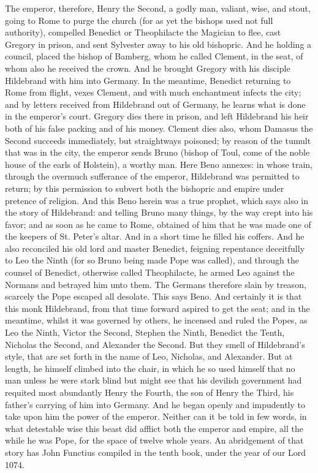 The emperor, therefore, Henry the Second, a godly man, valiant, wise, and stout, going to Rome to purge the church (for as yet the bishops used not full authority), compelled Benedict or Theophilacte the Magician to flee, cast Gregory in prison, and sent Sylvester away to his old bishopric. And he holding a council, placed the bishop of Bamberg, whom he called Clement, in the seat, of whom also he received the crown. And he brought Gregory with his disciple Hildebrand with him into Germany. In the meantime, Benedict returning to Rome from flight, vexes Clement, and with much enchantment infects the city; and by letters received from Hildebrand out of Germany, he learns what is done in the emperor’s court. Gregory dies there in prison, and left Hildebrand his heir both of his false packing and of his money. Clement dies also, whom Damasus the Second succeeds immediately, but straightways poisoned; by reason of the tumult that was in the city, the emperor sends Bruno (bishop of Toul, come of the noble house of the earls of Holstein), a worthy man. Here Beno annexes: in whose train, through the overmuch sufferance of the emperor, Hildebrand was permitted to return; by this permission to subvert both the bishopric and empire under pretence of religion. And this Beno herein was a true prophet, which says also in the story of Hildebrand: and telling Bruno many things, by the way crept into his favor; and as soon as he came to Rome, obtained of him that he was made one of the keepers of St. Peter’s altar. And in a short time he filled his coffers. And he also reconciled his old lord and master Benedict, feigning repentance deceitfully to Leo the Ninth (for so Bruno being made Pope was called), and through the counsel of Benedict, otherwise called Theophilacte, he armed Leo against the Normans and betrayed him unto them. The Germans therefore slain by treason, scarcely the Pope escaped all desolate. This says Beno. And certainly it is that this monk Hildebrand, from that time forward aspired to get the seat; and in the meantime, whilst it was governed by others, he incensed and ruled the Popes, as Leo the Ninth, Victor the Second, Stephen the Ninth, Benedict the Tenth, Nicholas the Second, and Alexander the Second. But they smell of Hildebrand’s style, that are set forth in the name of Leo, Nicholas, and Alexander. But at length, he himself climbed into the chair, in which he so used himself that no man unless he were stark blind but might see that his devilish government had requited most abundantly Henry the Fourth, the son of Henry the Third, his father’s carrying of him into Germany. And he began openly and impudently to take upon him the power of the emperor. Neither can it be told in few words, in what detestable wise this beast did afflict both the emperor and empire, all the while he was Pope, for the space of twelve whole years. An abridgement of that story has John Functius compiled in the tenth book, under the year of our Lord 1074.


